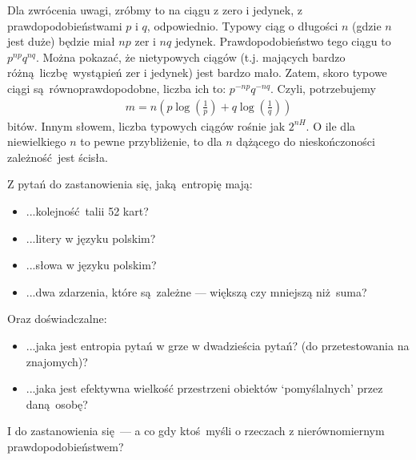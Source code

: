 \documentclass[10pt,a4paper]{article}
\begin{document}
Dla zwrócenia uwagi, zróbmy to na ciągu z zero i jedynek, z prawdopodobieństwami $p$ i $q$, odpowiednio.
Typowy ciąg o długości $n$ (gdzie $n$ jest duże) będzie miał $n p$ zer i $n q$ jedynek.
Prawdopodobieństwo tego ciągu to $p^{n p}q^{n q}$.
Można pokazać, że nietypowych ciągów (t.j. mających bardzo różną liczbę wystąpień zer i jedynek) jest bardzo mało.
Zatem, skoro typowe ciągi są równoprawdopodobne, liczba ich to:
$p^{-n p}q^{-n q}$.
Czyli, potrzebujemy
%
\begin{align}
    m=n \left( p \log(\tfrac{1}{p}) + q \log(\tfrac{1}{q}) \right)
\end{align}
%
bitów.
Innym słowem, liczba typowych ciągów rośnie jak $2^{n H}$.
O ile dla niewielkiego $n$ to pewne przybliżenie, to dla $n$ dążącego do nieskończoności zależność jest ścisła.


Z pytań do zastanowienia się, jaką entropię mają:
\begin{itemize}
    \item ...kolejność talii 52 kart?
    \item ...litery w języku polskim?
    \item ...słowa w języku polskim?
    \item ...dwa zdarzenia, które są zależne --- większą czy mniejszą niż suma?
\end{itemize}

Oraz doświadczalne:
\begin{itemize}
    \item ...jaka jest entropia pytań w grze w dwadzieścia pytań? (do przetestowania na znajomych)?
    \item ...jaka jest efektywna wielkość przestrzeni obiektów `pomyślalnych' przez daną osobę?
\end{itemize}
I do zastanowienia się --- a co gdy ktoś myśli o rzeczach z nierównomiernym prawdopodobieństwem?
\end{document}
